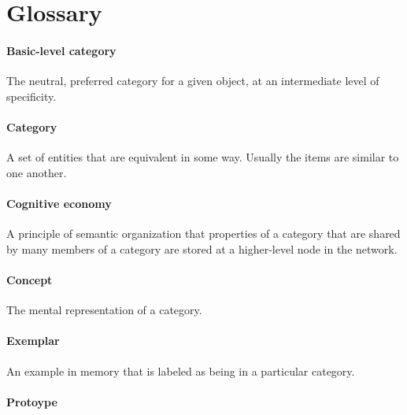 \documentclass[
]{krantz}
\begin{document}
\hypertarget{glossary-6}{%
\section{Glossary}\label{glossary-6}}

\hypertarget{basic-level-category}{%
\paragraph*{Basic-level category}\label{basic-level-category}}

The neutral, preferred category for a given object, at an intermediate level of specificity.

\hypertarget{category}{%
\paragraph*{Category}\label{category}}

A set of entities that are equivalent in some way. Usually the items are similar to one another.

\hypertarget{cognitive-economy}{%
\paragraph*{Cognitive economy}\label{cognitive-economy}}

A principle of semantic organization that properties of a category that are shared by many members of a category are stored at a higher-level node in the network.

\hypertarget{concept}{%
\paragraph*{Concept}\label{concept}}

The mental representation of a category.

\hypertarget{exemplar}{%
\paragraph*{Exemplar}\label{exemplar}}

An example in memory that is labeled as being in a particular category.

\hypertarget{protoype}{%
\paragraph*{Protoype}\label{protoype}}
\end{document}
